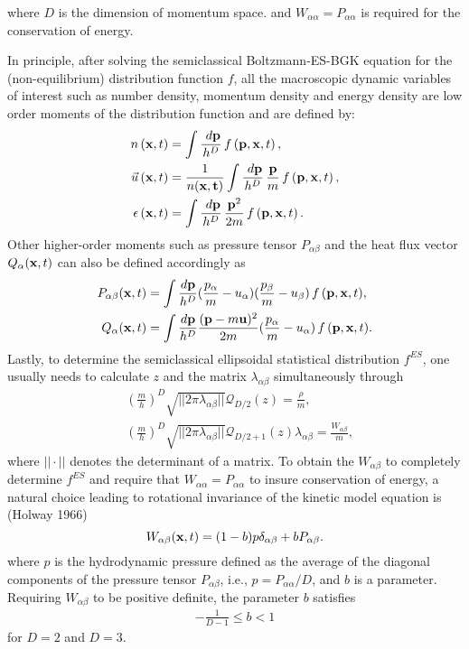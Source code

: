 \documentclass{rsproca}%
\begin{document}
where $D$ is the dimension of momentum space. and $W_{\alpha \alpha} = P_{\alpha \alpha}$ is required for the conservation of energy.

In principle, after solving the semiclassical Boltzmann-ES-BGK equation for the (non-equilibrium) distribution function $f$, all the macroscopic dynamic variables of interest such as number density, momentum density and energy density are low order moments of the distribution function and are defined by:
\begin{subequations}
\begin{align}
n\left({\bf x},t\right) &= \int{\frac{\ d{\bf p}}{h^D}}\,f\left({\bf p},{\bf x}, t\right), \\
\vec u \left({\bf x},t\right) &= \frac{1}{n(\bf x, t)}\int{\frac{\ d{\bf p}}{h^D}\,\frac{\bf p}{m}}\,f\left({\bf p},{\bf x}, t\right), \\
{\epsilon}\left({\bf x},t\right) &= \int{\frac{\ d{\bf p}}{h^D}\,\frac{{\bf p}^2}{2m}}\,f\left({\bf p},{\bf x}, t\right).
\end{align}
\end{subequations}
Other higher-order moments such as pressure tensor $P_{\alpha \beta}$ and the heat flux vector $Q_{\alpha}({\bf x},t)$ can also be defined accordingly as
\begin{align}
P_{\alpha \beta}({\bf x},t) &= \int{\frac{d{\bf p}}{h^D}(\frac{p_{\alpha}}{m}-u_{\alpha})(\frac{p_{\beta}}{m}-u_{\beta})\,f\,({\bf p},{\bf x},t)}, \\
Q_{\alpha}({\bf x},t) &= \int{\frac{d{\bf p}}{h^D}\frac{({\bf p}-m{\bf u})^2}{2m}(\frac{p_{\alpha}}{m}-u_{\alpha})\,f\,({\bf p},{\bf x},t)}.
\label{stressflux}
\end{align}
Lastly, to determine the semiclassical ellipsoidal statistical distribution $f^{ES}$, one usually needs to calculate $z$ and the matrix $\lambda_{\alpha \beta}$ simultaneously through
\begin{align}
&(\frac{m}{h})^D \sqrt{ ||2 \pi \lambda_{\alpha \beta}|| } \mathcal{Q}_{D/2}(z)= \frac{\rho}{m}, \\
&(\frac{m}{h})^D \sqrt{ ||2 \pi \lambda_{\alpha \beta}|| } \mathcal{Q}_{D/2 +1}(z) \lambda_{\alpha \beta} = \frac{W_{\alpha \beta}}{m},
\end{align}
where $||\cdot ||$ denotes the determinant of a matrix.   To obtain the $W_{\alpha \beta}$ to completely determine $f^{ES}$ and require that $W_{\alpha \alpha}=P_{\alpha \alpha}$ to insure conservation of energy, a natural choice leading to rotational invariance of the kinetic model equation is (Holway 1966)
\begin{equation}
W_{\alpha \beta}({\bf x},t) = (1 - b) p \delta_{\alpha \beta} + b P_{\alpha \beta}.
\end{equation}
where $p$ is the hydrodynamic pressure defined as the average of the diagonal components of the pressure tensor $P_{\alpha \beta}$, i.e., $p = P_{\alpha \alpha}/D$, and $b$ is a parameter.  Requiring $W_{\alpha \beta}$ to be positive definite, the parameter $b$ satisfies
\begin{align}
-\frac{1}{D-1} \le b < 1
\end{align}
for $D=2$ and $D=3$.
\end{document}
